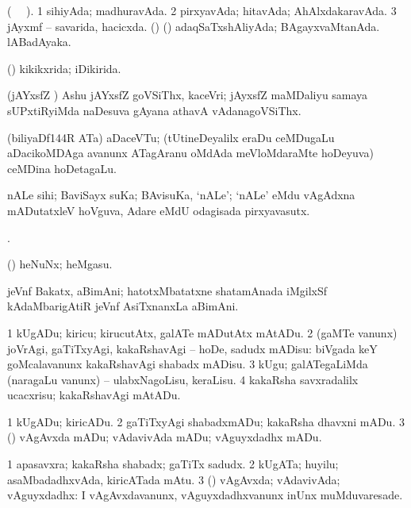 \bentry
{}
\gl{\gu}
\bmng
(\tara\  \tama\ ). 
\bnum
\num{1} sihiyAda; madhuravAda. 
\num{2} pirxyavAda; hitavAda; AhAlxdakaravAda. 
\num{3} jAyxmf -- savarida, hacicxda. 
 (\birx) (\AmA) 
\banum
{} adaqSaTxshAliyAda; BAgayxvaMtanAda. 
 lABadAyaka. 
\eanum
\numie
\enum
\emng
\eentry

\bentry
{}
\gl{\gu}
\bmng
(\AmA) kikikxrida; iDikirida. 
\emng
\eentry

\bentry
{}
\gl{\nA}
\bmng
(jAYxsfZ \AmA) Ashu jAYxsfZ goVSiThx, kaceVri; jAyxsfZ maMDaliyu samaya sUPxtiRyiMda naDesuva gAyana athavA vAdanagoVSiThx. 
\emng
\eentry

\bentry
{}
\gl{\nA}
\bmng
(biliyaDf\char144R ATa) aDaceVTu; (tUtineDeyalilx eraDu ceMDugaLu aDacikoMDAga avanunx ATagAranu oMdAda meVloMdaraMte hoDeyuva) ceMDina hoDetagaLu. 
\emng
\eentry

\bentry
{}
\gl{\nA}
\bmng
nALe sihi; BaviSayx suKa; BAvisuKa, `nALe'; `nALe' eMdu vAgAdxna mADutatxleV hoVguva, Adare eMdU odagisada pirxyavasutx. 
\emng
\eentry

\bentry
{}
\gl{\saMkiSx}
\bmng
{}. 
\emng
\eentry

\bentry
{}
\gl{\nA}
\bmng
(\ashi) heNuNx; heMgasu. 
\emng
\eentry

\bentry
{}
\gl{\nA}
\bmng
jeVnf Bakatx, aBimAni; hatotxMbatatxne shatamAnada iMgilxSf kAdaMbarigAtiR jeVnf AsiTxnanxLa aBimAni. 
\emng
\eentry

\bentry
{}
\gl{\sakirx}
\bmng
\bnum
\num{1} kUgADu; kiricu; kirucutAtx, galATe mADutAtx mAtADu. 
\num{2} (gaMTe \mo vanunx) joVrAgi, gaTiTxyAgi, kakaRshavAgi -- hoDe, sadudx mADisu:  biVgada keY goMcalavanunx kakaRshavAgi shabadx mADisu. 
\num{3} kUgu; galATegaLiMda (naragaLu \mo vanunx) -- ulabxNagoLisu, keraLisu. 
\num{4} kakaRsha savxradalilx ucacxrisu; kakaRshavAgi mAtADu. 
\enum
\emng

\noindent
\gl{\akirx}
\bmng
\bnum
\num{1} kUgADu; kiricADu. 
\num{2} gaTiTxyAgi shabadxmADu; kakaRsha dhavxni mADu. 
\num{3} (\pArxparx) vAgAvxda mADu; vAdavivAda mADu; vAguyxdadhx mADu. 
\enum
\emng
\eentry

\bentry
{}
\gl{\nA}
\bmng
\bnum
\num{1} apasavxra; kakaRsha shabadx; gaTiTx sadudx. 
\num{2} kUgATa; huyilu; asaMbadadhxvAda, kiricATada mAtu. 
\num{3} (\pArxparx) vAgAvxda; vAdavivAda; vAguyxdadhx:  I vAgAvxdavanunx, vAguyxdadhxvanunx inUnx muMduvaresade. 
\enum
\emng
\eentry

